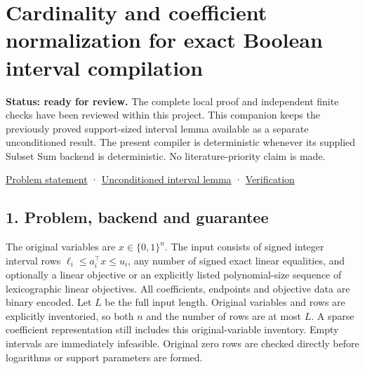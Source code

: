 
\hypertarget{af-2bf1c1784c-cardinality-and-coefficient-normalization-for-exact-boolean-interval-compilation}{%
\section{Cardinality and coefficient normalization for exact Boolean interval compilation}\label{af-2bf1c1784c-cardinality-and-coefficient-normalization-for-exact-boolean-interval-compilation}}

\textbf{Status: ready for review.} The complete local proof and independent finite checks have been reviewed within this project. This companion keeps the previously proved support-sized interval lemma available as a separate unconditioned result. The present compiler is deterministic whenever its supplied Subset Sum backend is deterministic. No literature-priority claim is made.

\href{https://github.com/icekylinx/algorithm-frontier/blob/main/problems/boolean-linear-compiler/README.md}{Problem statement} · \href{https://github.com/icekylinx/algorithm-frontier/blob/main/problems/boolean-linear-compiler/manuscripts/boolean-linear-optimization-compiler.md}{Unconditioned interval lemma} · \href{https://github.com/icekylinx/algorithm-frontier/blob/main/problems/boolean-linear-compiler/verify/README.md}{Verification}

\hypertarget{af-2bf1c1784c-problem-backend-and-guarantee}{%
\subsection{1. Problem, backend and guarantee}\label{af-2bf1c1784c-problem-backend-and-guarantee}}

The original variables are \(x\in\{0,1\}^n\). The input consists of signed integer interval rows \(\ell_i\le a_i^\top x\le u_i\), any number of signed exact linear equalities, and optionally a linear objective or an explicitly listed polynomial-size sequence of lexicographic linear objectives. All coefficients, endpoints and objective data are binary encoded. Let \(L\) be the full input length. Original variables and rows are explicitly inventoried, so both \(n\) and the number of rows are at most \(L\). A sparse coefficient representation still includes this original-variable inventory. Empty intervals are immediately infeasible. Original zero rows are checked directly before logarithms or support parameters are formed.


